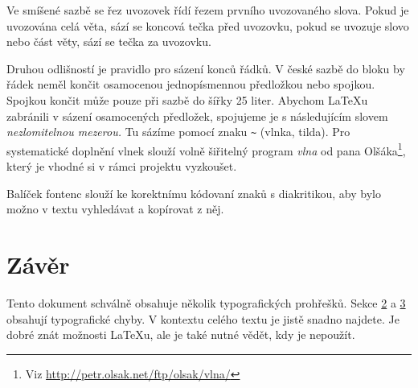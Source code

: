 \documentclass[twocolumn, 10pt,a 4paper]{article}
\begin{document}
\par Ve smíšené sazbě se řez uvozovek řídí řezem prvního uvozovaného slova.
Pokud je uvozována celá věta, sází se koncová tečka před uvozovku, pokud se uvozuje slovo nebo část věty, sází se tečka za uvozovku.

\par Druhou odlišností je pravidlo pro sázení konců řádků.
V české sazbě do bloku by řádek neměl končit osamocenou jednopísmennou předložkou nebo spojkou.
Spojkou  končit může pouze při sazbě do šířky 25 liter.
Abychom \LaTeX u zabránili v sázení osamocených předložek, spojujeme je s následujícím slovem \emph{nezlomitelnou mezerou.} 
Tu sázíme pomocí znaku \verb|~| (vlnka, tilda).
Pro systematické doplnění vlnek slouží volně šiřitelný program \emph{vlna} 
od pana Olšáka\footnote[2]{Viz \href{http://petr.olsak.net/ftp/olsak/vlna/}{ http://petr.olsak.net/ftp/olsak/vlna/}}, 
který je vhodné si v rámci projektu vyzkoušet.

\par Balíček fontenc slouží ke korektnímu kódovaní znaků s diakritikou, aby bylo možno v textu vyhledávat a kopírovat z něj.

\section{Závěr}
Tento dokument schválně obsahuje několik typografických prohřešků.
Sekce \hyperref[sec:sazba]{2} a \hyperref[sec:rady]{3} obsahují typografické chyby.
V kontextu celého textu je jistě snadno najdete.
Je dobré znát možnosti \LaTeX u, ale je také nutné vědět, kdy je nepoužít.
\end{document}
